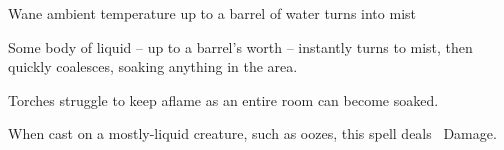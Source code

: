   {\mWater}%
  {Wane}%
  {}%
  {ambient temperature}%
  {up to a barrel of water turns into mist}%
  {
    Some body of liquid -- up to a barrel's worth -- instantly turns to mist, then quickly coalesces, soaking anything in the area.

    Torches struggle to keep aflame as an entire room can become soaked.

    When cast on a mostly-liquid creature, such as oozes, this spell deals \rollConv~Damage.
  }


